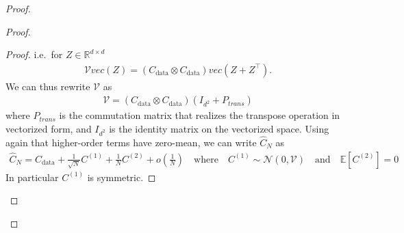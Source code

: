\documentclass[11pt]{article}
\newcommand{\RR}{\mathbb{R}}
\newcommand{\EE}{\mathbb{E}}
\newcommand{\cov}{\operatorname{Cov}}
\begin{document}
\begin{proof}
\begin{proof}
\begin{proof}
i.e.~for $Z \in \RR^{d \times d}$
\begin{align*}
    \mathcal{V} vec(Z) = (C_\mathrm{data} \otimes C_\mathrm{data}) vec(Z + Z^\top) .
\end{align*}
We can thus rewrite $\mathcal{V}$ as 
\begin{align*} 
    \mathcal{V} = (C_\mathrm{data} \otimes C_\mathrm{data})  ( I_{d^2} + P_{trans})
\end{align*}
where $P_{trans}$ is the commutation matrix that realizes the transpose operation in vectorized form, and $I_{d^2}$ is the identity matrix on the vectorized space. Using again that higher-order terms have zero-mean, we can write $\hat C_N$ as 
\begin{align*} 
\hat C_N =  C_\mathrm{data} + \frac{1}{\sqrt{N}}   C^{(1)} + \frac{1}{N}   C^{(2)} + o\left( \frac{1}{N}\right) \quad \text{where} \quad   C^{(1)} \sim \mathcal{N} (0, \mathcal{V}) \quad \text{and} \quad \EE[  C^{(2)}] = 0
\end{align*}
In particular $C^{(1)}$ is symmetric.
\end{proof}





\end{proof}
\end{proof}
\end{document}
